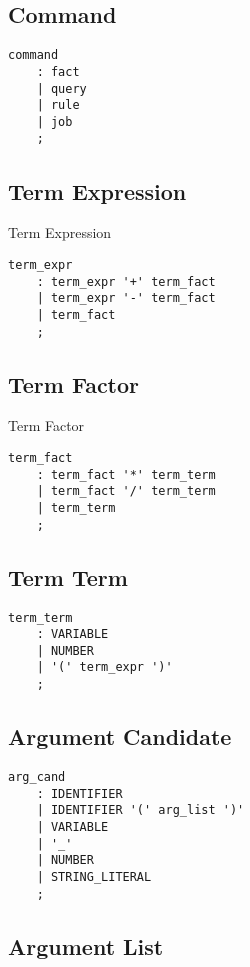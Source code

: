 \documentclass[prodmode,acmtecs]{acmsmall}
\begin{document}
\subsection{Command}

\begin{lstlisting}
command
	: fact
	| query
	| rule
	| job
	;
\end{lstlisting}

\subsection{Term Expression}

Term Expression
\begin{lstlisting}
term_expr
	: term_expr '+' term_fact
	| term_expr '-' term_fact
	| term_fact
	;
\end{lstlisting}

\subsection{Term Factor}

Term Factor
\begin{lstlisting}
term_fact
	: term_fact '*' term_term
	| term_fact '/' term_term
	| term_term
	;
\end{lstlisting}


\subsection{Term Term}

\begin{lstlisting}
term_term
	: VARIABLE
	| NUMBER
	| '(' term_expr ')'
	;
\end{lstlisting}


\subsection{Argument Candidate}

\begin{lstlisting}
arg_cand
	: IDENTIFIER
	| IDENTIFIER '(' arg_list ')'
	| VARIABLE
	| '_'
	| NUMBER
	| STRING_LITERAL
	;
\end{lstlisting}


\subsection{Argument List}
\end{document}
